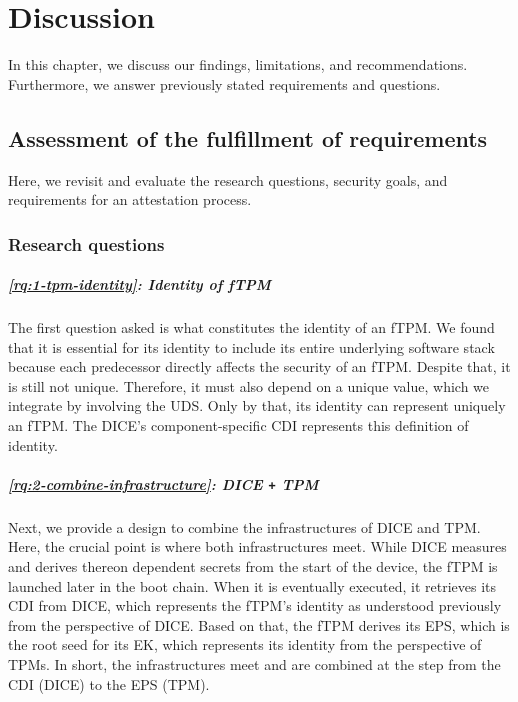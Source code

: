 
\chapter{Discussion}\label{chapter:discussion}

In this chapter, we discuss our findings, limitations, and recommendations.
Furthermore, we answer previously stated requirements and questions.

\section{Assessment of the fulfillment of requirements}

Here, we revisit and evaluate the research questions, security goals, and requirements for an attestation process.

\subsection{Research questions}


\paragraph{\ref{rq:1-tpm-identity}: Identity of \ac{fTPM}}\label{par:identity}
The first question asked is what constitutes the identity of an fTPM\@.
We found that it is essential for its identity to include its entire underlying software stack because each predecessor directly affects the security of an \ac{fTPM}.
Despite that, it is still not unique.
Therefore, it must also depend on a unique value, which we integrate by involving the \ac{UDS}.
Only by that, its identity can represent uniquely an \ac{fTPM}.
The \ac{DICE}'s component-specific \ac{CDI} represents this definition of identity.

\paragraph{\ref{rq:2-combine-infrastructure}: \acs{DICE} \texttt{+} \acs{TPM}}
Next, we provide a design to combine the infrastructures of \ac{DICE} and \ac{TPM}.
Here, the crucial point is where both infrastructures meet.
While \ac{DICE} measures and derives thereon dependent secrets from the start of the device, the \ac{fTPM} is launched later in the boot chain.
When it is eventually executed, it retrieves its \ac{CDI} from \ac{DICE}, which represents the fTPM's identity as understood previously from the perspective of \ac{DICE}.
Based on that, the \ac{fTPM} derives its \ac{EPS}, which is the root seed for its \ac{EK}, which represents its identity from the perspective of \acp{TPM}.
In short, the infrastructures meet and are combined at the step from the \ac{CDI} (DICE) to the \ac{EPS} (TPM).

